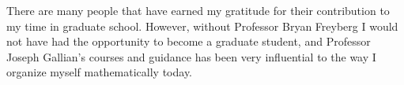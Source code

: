 There are many people that have earned my gratitude for their contribution to my time
in graduate school. However, without Professor Bryan Freyberg I would not have had the opportunity to become a graduate student, and Professor Joseph Gallian's courses and guidance has been very influential to the way I organize myself mathematically today. 